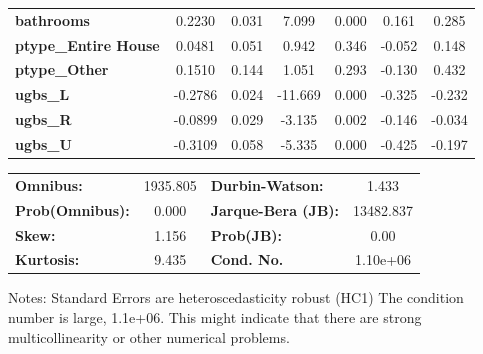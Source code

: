 \begin{center}
\begin{tabular}{lcccccc}
\textbf{bathrooms}              &       0.2230  &        0.031     &     7.099  &         0.000        &        0.161    &        0.285     \\
\textbf{ptype\_Entire House}    &       0.0481  &        0.051     &     0.942  &         0.346        &       -0.052    &        0.148     \\
\textbf{ptype\_Other}           &       0.1510  &        0.144     &     1.051  &         0.293        &       -0.130    &        0.432     \\
\textbf{ugbs\_L}                &      -0.2786  &        0.024     &   -11.669  &         0.000        &       -0.325    &       -0.232     \\
\textbf{ugbs\_R}                &      -0.0899  &        0.029     &    -3.135  &         0.002        &       -0.146    &       -0.034     \\
\textbf{ugbs\_U}                &      -0.3109  &        0.058     &    -5.335  &         0.000        &       -0.425    &       -0.197     \\
\bottomrule
\end{tabular}
\begin{tabular}{lclc}
\textbf{Omnibus:}       & 1935.805 & \textbf{  Durbin-Watson:     } &     1.433  \\
\textbf{Prob(Omnibus):} &   0.000  & \textbf{  Jarque-Bera (JB):  } & 13482.837  \\
\textbf{Skew:}          &   1.156  & \textbf{  Prob(JB):          } &      0.00  \\
\textbf{Kurtosis:}      &   9.435  & \textbf{  Cond. No.          } &  1.10e+06  \\
\bottomrule
\end{tabular}
\end{center}

Notes: \newline
 [1] Standard Errors are heteroscedasticity robust (HC1) \newline
 [2] The condition number is large, 1.1e+06. This might indicate that there are \newline
 strong multicollinearity or other numerical problems.